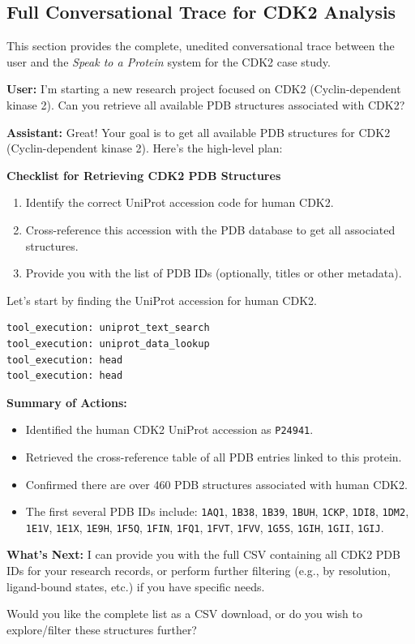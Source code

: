 \documentclass{article}
\begin{document}
\newpage
\subsection{Full Conversational Trace for CDK2 Analysis}
\label{sec:appendix_trace_cdk2}

This section provides the complete, unedited conversational trace between the user and the \emph{Speak to a Protein} system for the CDK2 case study.

\vspace{1em}

\begin{userbox}
\textbf{User:} I'm starting a new research project focused on CDK2 (Cyclin-dependent kinase 2). Can you retrieve all available PDB structures associated with CDK2?
\end{userbox}

\begin{assistantbox}
\textbf{Assistant:} Great! Your goal is to get all available PDB structures for CDK2 (Cyclin-dependent kinase 2). Here’s the high-level plan:

\textbf{Checklist for Retrieving CDK2 PDB Structures}
\begin{enumerate}
    \item Identify the correct UniProt accession code for human CDK2.
    \item Cross-reference this accession with the PDB database to get all associated structures.
    \item Provide you with the list of PDB IDs (optionally, titles or other metadata).
\end{enumerate}

Let’s start by finding the UniProt accession for human CDK2.
\begin{verbatim}
tool_execution: uniprot_text_search
tool_execution: uniprot_data_lookup
tool_execution: head
tool_execution: head
\end{verbatim}
\textbf{Summary of Actions:}
\begin{itemize}
    \item Identified the human CDK2 UniProt accession as \texttt{P24941}.
    \item Retrieved the cross-reference table of all PDB entries linked to this protein.
    \item Confirmed there are over 460 PDB structures associated with human CDK2.
    \item The first several PDB IDs include: \texttt{1AQ1}, \texttt{1B38}, \texttt{1B39}, \texttt{1BUH}, \texttt{1CKP}, \texttt{1DI8}, \texttt{1DM2}, \texttt{1E1V}, \texttt{1E1X}, \texttt{1E9H}, \texttt{1F5Q}, \texttt{1FIN}, \texttt{1FQ1}, \texttt{1FVT}, \texttt{1FVV}, \texttt{1G5S}, \texttt{1GIH}, \texttt{1GII}, \texttt{1GIJ}.
\end{itemize}
\textbf{What’s Next:} I can provide you with the full CSV containing all CDK2 PDB IDs for your research records, or perform further filtering (e.g., by resolution, ligand-bound states, etc.) if you have specific needs.

Would you like the complete list as a CSV download, or do you wish to explore/filter these structures further?
\end{assistantbox}
\end{document}
